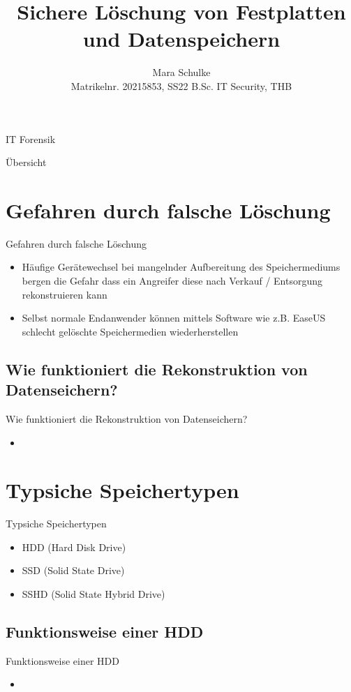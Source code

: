 \documentclass{beamer}
\title{Sichere Löschung von Festplatten und Datenspeichern}
\author{Mara Schulke\\\tiny{Matrikelnr. 20215853, SS22 B.Sc. IT Security, THB}}
\begin{document}
\begin{frame}
	IT Forensik
	\vspace{1em}
	\titlepage
\end{frame}

\begin{frame}{Übersicht}
	\tableofcontents
\end{frame}

\section{Gefahren durch falsche Löschung}
\begin{frame}{Gefahren durch falsche Löschung}
	\begin{itemize}
		\item Häufige Gerätewechsel bei mangelnder Aufbereitung des Speichermediums
			bergen die Gefahr dass ein Angreifer diese nach Verkauf / Entsorgung
			rekonstruieren kann
		\item Selbst normale Endanwender können mittels Software wie z.B.
			EaseUS schlecht gelöschte Speichermedien wiederherstellen 
	\end{itemize}
\end{frame}

\subsection{Wie funktioniert die Rekonstruktion von Datenseichern?}
\begin{frame}{Wie funktioniert die Rekonstruktion von Datenseichern?}
	\begin{itemize}
		\item 
	\end{itemize}
\end{frame}

\section{Typsiche Speichertypen}
\begin{frame}{Typsiche Speichertypen}
	\begin{itemize}
		\item HDD (Hard Disk Drive)
		\item SSD (Solid State Drive)
		\item SSHD (Solid State Hybrid Drive)
	\end{itemize}
\end{frame}

\subsection{Funktionsweise einer HDD}
\begin{frame}{Funktionsweise einer HDD}
	\begin{itemize}
		\item 
	\end{itemize}
\end{frame}
\end{document}

